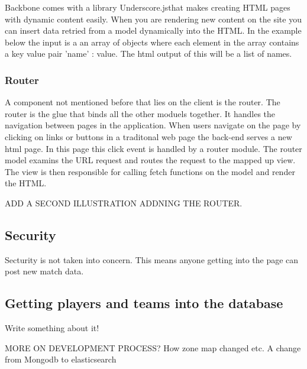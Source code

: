 Backbone comes with a library Underscore.js\footnotemark that makes creating HTML pages with dynamic content easily. When you are rendering new content on the site you can insert data retried from a model dynamically into the HTML. In the example below the input is a an array of objects where each element in the array contains a key value pair 'name' : value. The html output of this will be a list of names.




\subsubsection{Router}

A component not mentioned before that lies on the client is the router. The router is the glue that binds all the other moduels together. It handles the navigation between pages in the application. When users navigate on the page by clicking on links or buttons in a traditonal web page the back-end serves a new html page. In this page this click event is handled by a router module. The router model examins the URL request and routes the request to the mapped up view. The view is then responsible for calling fetch functions on the model and render the HTML.

ADD A SECOND ILLUSTRATION ADDNING THE ROUTER.

\subsection{Security}
Secturity is not taken into concern. This means anyone getting into the page can post new match data. 

\subsection{Getting players and teams into the database}

Write something about it!

MORE ON DEVELOPMENT PROCESS? How zone map changed etc. A change from Mongodb to elasticsearch



